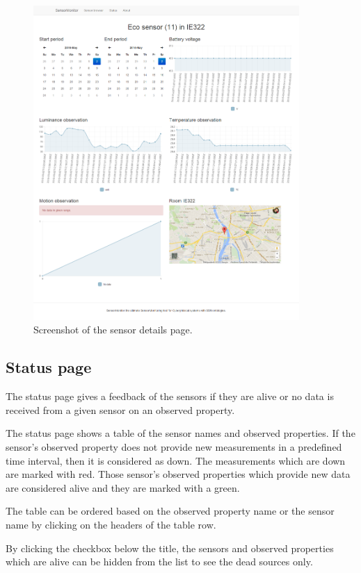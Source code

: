 \begin{figure}[h]
\centering
\includegraphics[width=0.9\textwidth]{figures/shshow.png}
\caption{Screenshot of the sensor details page.\label{fig:shshow}}
\end{figure}

\subsection{Status page}

The status page gives a feedback of the sensors if they are alive or no data is received from a given sensor on an observed property.

The status page shows a table of the sensor names and observed properties. If the sensor's observed property does not provide new measurements in a predefined time interval, then it is considered as down. The measurements which are down are marked with red. Those sensor's observed properties which provide new data are considered alive and they are marked with a green. 

The table can be ordered based on the observed property name or the sensor name by clicking on the headers of the table row. 

By clicking the checkbox below the title, the sensors and observed properties which are alive can be hidden from the list to see the dead sources only.

